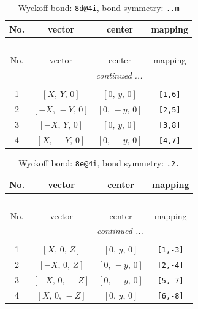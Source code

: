 \documentclass[fleqn,8pt]{jsarticle}
\begin{document}
\begin{longtable}{cccc}
\caption{Wyckoff bond: {\tt 8d@4i}, bond symmetry: {\tt ..m}}
 \\
 \hline \hline
No. & vector & center & mapping \\ \hline \endfirsthead

\multicolumn{3}{l}{\tablename\ \thetable{}} \\
 \hline \hline
No. & vector & center & mapping \\ \hline \endhead

 \hline \hline
\multicolumn{3}{r}{\footnotesize\it continued ...} \\ \endfoot

 \hline \hline
\multicolumn{3}{r}{} \\ \endlastfoot

1 & $\left[ X,\, Y,\, 0 \right]$ & $\left[ 0,\, y,\, 0 \right]$ & {\tt [1,6]} \\ \hline
2 & $\left[ - X,\, - Y,\, 0 \right]$ & $\left[ 0,\, - y,\, 0 \right]$ & {\tt [2,5]} \\ \hline
3 & $\left[ - X,\, Y,\, 0 \right]$ & $\left[ 0,\, y,\, 0 \right]$ & {\tt [3,8]} \\ \hline
4 & $\left[ X,\, - Y,\, 0 \right]$ & $\left[ 0,\, - y,\, 0 \right]$ & {\tt [4,7]} \\
\end{longtable}
\renewcommand{\arraystretch}{1.2}
\begin{longtable}{cccc}
\caption{Wyckoff bond: {\tt 8e@4i}, bond symmetry: {\tt .2.}}
 \\
 \hline \hline
No. & vector & center & mapping \\ \hline \endfirsthead

\multicolumn{3}{l}{\tablename\ \thetable{}} \\
 \hline \hline
No. & vector & center & mapping \\ \hline \endhead

 \hline \hline
\multicolumn{3}{r}{\footnotesize\it continued ...} \\ \endfoot

 \hline \hline
\multicolumn{3}{r}{} \\ \endlastfoot

1 & $\left[ X,\, 0,\, Z \right]$ & $\left[ 0,\, y,\, 0 \right]$ & {\tt [1,-3]} \\ \hline
2 & $\left[ - X,\, 0,\, Z \right]$ & $\left[ 0,\, - y,\, 0 \right]$ & {\tt [2,-4]} \\ \hline
3 & $\left[ - X,\, 0,\, - Z \right]$ & $\left[ 0,\, - y,\, 0 \right]$ & {\tt [5,-7]} \\ \hline
4 & $\left[ X,\, 0,\, - Z \right]$ & $\left[ 0,\, y,\, 0 \right]$ & {\tt [6,-8]} \\
\end{longtable}
\end{document}
